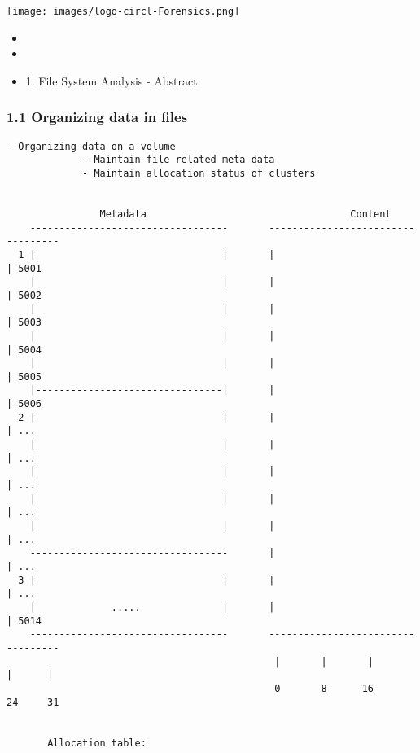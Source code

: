 %
%



\begin{frame}
    \texttt{[image: images/logo-circl-Forensics.png]}
    \begin{itemize}
        \item[]
        \item[]
        \item[] 1. File System Analysis - Abstract
    \end{itemize}
\end{frame}


\begin{frame}[fragile]
  \frametitle{1.1 Organizing data in files}
  \begin{lstlisting}[basicstyle=\tiny\ttfamily]
             - Organizing data on a volume
             - Maintain file related meta data
             - Maintain allocation status of clusters
                            

                Metadata                                   Content     
    ----------------------------------       ----------------------------------
  1 |                                |       |                                | 5001
    |                                |       |                                | 5002
    |                                |       |                                | 5003
    |                                |       |                                | 5004
    |                                |       |                                | 5005
    |--------------------------------|       |                                | 5006
  2 |                                |       |                                | ...
    |                                |       |                                | ...
    |                                |       |                                | ...
    |                                |       |                                | ...
    |                                |       |                                | ...
    ----------------------------------       |                                | ...
  3 |                                |       |                                | ...
    |             .....              |       |                                | 5014
    ----------------------------------       ----------------------------------
                                              |       |       |       |      |
                                              0       8      16      24     31


       Allocation table:
  \end{lstlisting}
\end{frame}


